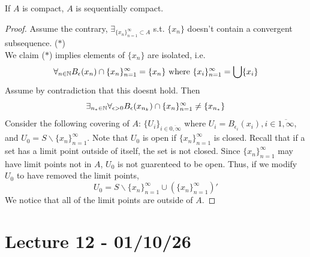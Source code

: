 \documentclass[11pt]{article}
\begin{document}
\begin{theorem}[9.1]
    If $A$ is compact, $A$ is sequentially compact.
\end{theorem}
\begin{proof}
    Assume the contrary, $\exists_{\{x_n\}_{n=1}^\infty \subset A}$ s.t. $\{x_n\}$ doesn't contain a convergent subsequence. ($*$)\\
    We claim ($*$) implies elements of $\{x_n\}$ are isolated, i.e. 
    \[
        \forall _{n \in \mathbb{N}}B_\epsilon(x_n) \cap \{x_n\}_{n=1}^\infty = \{x_n\} \text{ where } \{x_i\}_{n=1}^\infty = \bigcup \{x_i\}
    \]
    Assume by contradiction that this doesnt hold. Then
    \[
        \exists_{n_*\in \mathbb{N}}\forall_{\epsilon > 0}B_\epsilon(x_{n_k})\cap \{x_n\}_{n=1}^\infty \ne \{x_{n_*}\}
    \]
   Consider the following covering of $A$: $\{U_i\}_{i \in \overline{0,\infty}}$ where $U_i = B_{\epsilon_i}(x_i), i \in \overline{1, \infty}$, and $U_0 = S \backslash \{x_n\}_{n=1}^{\infty}$. Note that $U_0$ is open if $ \{x_n\}_{n=1}^{\infty}$ is closed.
   Recall that if a set has a limit point outside of itself, the set is not closed. Since $\{x_n\}_{n=1}^\infty$ may have limit points not in $A$, $U_0$ is not guarenteed to be open. Thus, if we modify $U_0$ to have removed the limit points,
   \[
    U_0 = S \backslash \{x_n\}_{n=1}^{\infty} \cup (\{x_n\}_{n=1}^{\infty})'
   \]
    We notice that all of the limit points are outside of $A$. 
\end{proof}

\section{Lecture 12 - 01/10/26}
\end{document}
